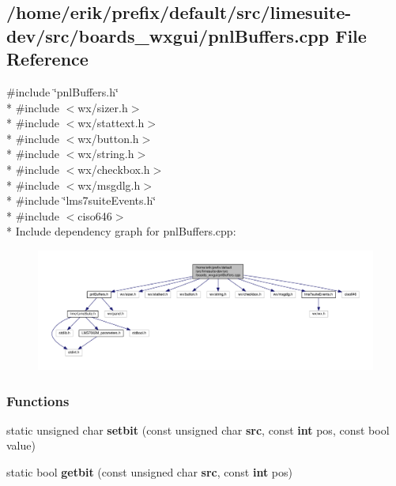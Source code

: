 \subsection{/home/erik/prefix/default/src/limesuite-\/dev/src/boards\+\_\+wxgui/pnl\+Buffers.cpp File Reference}
\label{pnlBuffers_8cpp}
{\ttfamily \#include \char`\"{}pnl\+Buffers.\+h\char`\"{}}\\*
{\ttfamily \#include $<$wx/sizer.\+h$>$}\\*
{\ttfamily \#include $<$wx/stattext.\+h$>$}\\*
{\ttfamily \#include $<$wx/button.\+h$>$}\\*
{\ttfamily \#include $<$wx/string.\+h$>$}\\*
{\ttfamily \#include $<$wx/checkbox.\+h$>$}\\*
{\ttfamily \#include $<$wx/msgdlg.\+h$>$}\\*
{\ttfamily \#include \char`\"{}lms7suite\+Events.\+h\char`\"{}}\\*
{\ttfamily \#include $<$ciso646$>$}\\*
Include dependency graph for pnl\+Buffers.\+cpp\+:
\nopagebreak
\begin{figure}[H]
\begin{center}
\leavevmode
\includegraphics[width=350pt]{d5/d92/pnlBuffers_8cpp__incl}
\end{center}
\end{figure}
\subsubsection*{Functions}
\begin{DoxyCompactItemize}
\item 
static unsigned char {\bf setbit} (const unsigned char {\bf src}, const {\bf int} pos, const bool value)
\item 
static bool {\bf getbit} (const unsigned char {\bf src}, const {\bf int} pos)
\end{DoxyCompactItemize}


